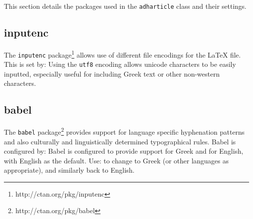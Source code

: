 \documentclass{adharticle}  %
\begin{document}
This section details the packages used in the \texttt{adharticle} class and
their settings.

\subsection{inputenc}

The \texttt{inputenc} package\footnote{http://ctan.org/pkg/inputenc} allows use
of different file encodings for the LaTeX file. This is set by:
Using the \texttt{utf8} encoding allows unicode characters to be easily
inputted, especially useful for including Greek text or other non-western
characters.

\subsection{babel}

The \texttt{babel} package\footnote{http://ctan.org/pkg/babel} provides support
for language specific hyphenation patterns and also culturally and
linguistically determined typographical rules. Babel is configured by:
Babel is configured to provide support for Greek and for English, with English
as the default. Use:
to change to Greek (or other  languages as appropriate), and similarly back to
English.
\end{document}
